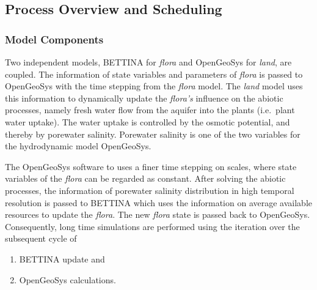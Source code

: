 \documentclass[manusscript, 12p, authoryear]{elsarticle}
\begin{document}
\subsection{Process Overview and Scheduling}
\subsubsection{Model Components} 
Two independent models, BETTINA for \textit{flora} and OpenGeoSys for \textit{land}, are coupled.
The information of state variables and parameters of \textit{flora} is passed to OpenGeoSys with the time stepping from the \textit{flora} model.
The \textit{land} model uses this information to dynamically update the \textit{flora's} influence on the abiotic processes, namely fresh water flow from the aquifer into the plants (i.e.~plant water uptake).
The water uptake is controlled by the osmotic potential, and thereby by porewater salinity.
Porewater salinity is one of the two variables for the hydrodynamic model OpenGeoSys.

The OpenGeoSys software to uses a finer time stepping on scales, where state variables of the \textit{flora} can be regarded as constant.
After solving the abiotic processes, the information of porewater salinity distribution in high temporal resolution is passed to BETTINA which uses the information on average available resources to update the \textit{flora}.
The new \textit{flora} state is passed back to OpenGeoSys.
Consequently, long time simulations are performed using the iteration over the subsequent cycle of
\begin{enumerate}
\item BETTINA update and
\item OpenGeoSys calculations.

\end{enumerate}
\end{document}

